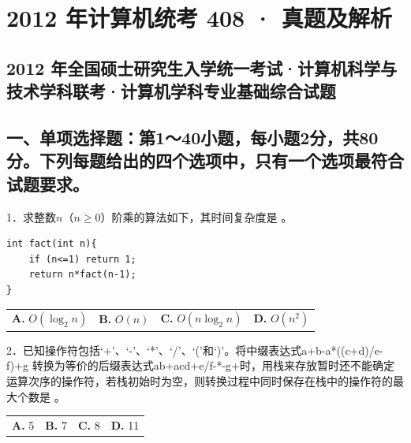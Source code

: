 \documentclass[UTF8,11pt]{ctexart}
\begin{document}
\section*{2012 年计算机统考 408 · 真题及解析}
\subsection*{2012 年全国硕士研究生入学统一考试·计算机科学与技术学科联考·计算机学科专业基础综合试题}

\subsection*{一、单项选择题：第1～40小题，每小题2分，共80分。下列每题给出的四个选项中，只有一个选项最符合试题要求。}

1．求整数\(\displaystyle n\)（\(\displaystyle n\ge0\)）阶乘的算法如下，其时间复杂度是 。


\begin{Verbatim}[breaklines,breakanywhere,fontsize=\small]
int fact(int n){
    if (n<=1) return 1;
    return n*fact(n-1);
}
\end{Verbatim}

\begin{center}\begin{tabular}{>{\raggedright\arraybackslash}p{\dimexpr(\linewidth-8\tabcolsep)/4\relax}>{\raggedright\arraybackslash}p{\dimexpr(\linewidth-8\tabcolsep)/4\relax}>{\raggedright\arraybackslash}p{\dimexpr(\linewidth-8\tabcolsep)/4\relax}>{\raggedright\arraybackslash}p{\dimexpr(\linewidth-8\tabcolsep)/4\relax}}
\textbf{A.} \(\displaystyle O(\log_2 n)\) & \textbf{B.} \(\displaystyle O(n)\) & \textbf{C.} \(\displaystyle O(n\log_2 n)\) & \textbf{D.} \(\displaystyle O(n^2)\)\\[.35em]\end{tabular}\end{center}

2．已知操作符包括‘+’、‘-’、‘*’、‘/’、‘(’和‘)’。将中缀表达式a+b-a*((c+d)/e-f)+g 转换为等价的后缀表达式ab+acd+e/f-*-g+时，用栈来存放暂时还不能确定运算次序的操作符，若栈初始时为空，则转换过程中同时保存在栈中的操作符的最大个数是 。


\begin{center}\begin{tabular}{>{\raggedright\arraybackslash}p{\dimexpr(\linewidth-8\tabcolsep)/4\relax}>{\raggedright\arraybackslash}p{\dimexpr(\linewidth-8\tabcolsep)/4\relax}>{\raggedright\arraybackslash}p{\dimexpr(\linewidth-8\tabcolsep)/4\relax}>{\raggedright\arraybackslash}p{\dimexpr(\linewidth-8\tabcolsep)/4\relax}}
\textbf{A.} 5 & \textbf{B.} 7 & \textbf{C.} 8 & \textbf{D.} 11\\[.35em]\end{tabular}\end{center}
\end{document}
